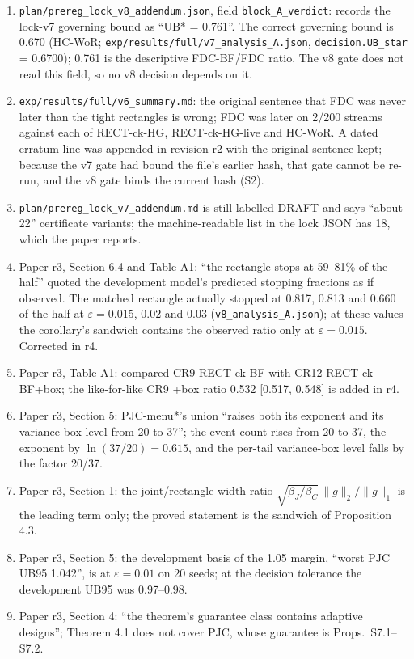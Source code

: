 \documentclass[sigconf,anonymous,review]{acmart}
\newcommand{\eps}{\varepsilon}
\begin{document}
\begin{enumerate}
\item \texttt{plan/prereg\_lock\_v8\_addendum.json}, field \texttt{block\_A\_verdict}: records the lock-v7 governing bound as ``UB* = 0.761''. The correct governing bound is 0.670 (HC-WoR; \texttt{exp/results/full/v7\_analysis\_A.json}, \texttt{decision.UB\_star} = 0.6700); 0.761 is the descriptive FDC-BF/FDC ratio. The v8 gate does not read this field, so no v8 decision depends on it.
\item \texttt{exp/results/full/v6\_summary.md}: the original sentence that FDC was never later than the tight rectangles is wrong; FDC was later on 2/200 streams against each of RECT-ck-HG, RECT-ck-HG-live and HC-WoR. A dated erratum line was appended in revision r2 with the original sentence kept; because the v7 gate had bound the file's earlier hash, that gate cannot be re-run, and the v8 gate binds the current hash (S2).
\item \texttt{plan/prereg\_lock\_v7\_addendum.md} is still labelled DRAFT and says ``about 22'' certificate variants; the machine-readable list in the lock JSON has 18, which the paper reports.
\item Paper r3, Section 6.4 and Table A1: ``the rectangle stops at 59--81\% of the half'' quoted the development model's predicted stopping fractions as if observed. The matched rectangle actually stopped at 0.817, 0.813 and 0.660 of the half at $\eps = 0.015$, 0.02 and 0.03 (\texttt{v8\_analysis\_A.json}); at these values the corollary's sandwich contains the observed ratio only at $\eps = 0.015$. Corrected in r4.
\item Paper r3, Table A1: compared CR9 RECT-ck-BF with CR12 RECT-ck-BF+box; the like-for-like CR9 +box ratio 0.532 [0.517, 0.548] is added in r4.
\item Paper r3, Section 5: PJC-menu*'s union ``raises both its exponent and its variance-box level from 20 to 37''; the event count rises from 20 to 37, the exponent by $\ln(37/20) = 0.615$, and the per-tail variance-box level falls by the factor 20/37.
\item Paper r3, Section 1: the joint/rectangle width ratio $\sqrt{\beta_J/\beta_C}\,\|g\|_2/\|g\|_1$ is the leading term only; the proved statement is the sandwich of Proposition 4.3.
\item Paper r3, Section 5: the development basis of the 1.05 margin, ``worst PJC UB95 1.042'', is at $\eps = 0.01$ on 20 seeds; at the decision tolerance the development UB95 was 0.97--0.98.
\item Paper r3, Section 4: ``the theorem's guarantee class contains adaptive designs''; Theorem 4.1 does not cover PJC, whose guarantee is Props.~S7.1--S7.2.

\end{enumerate}
\end{document}
